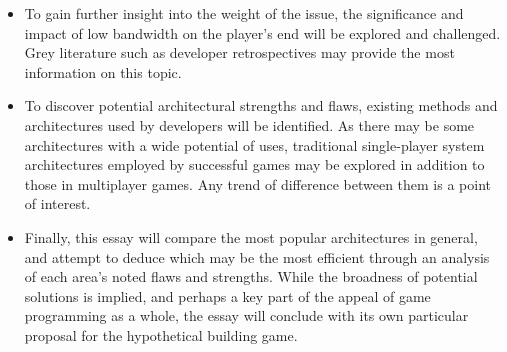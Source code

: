 \documentclass{scrartcl}
\begin{document}
\begin{itemize}
\item To gain further insight into the weight of the issue, the significance and impact of low bandwidth on the player's end will be explored and challenged. Grey literature such as developer retrospectives may provide the most information on this topic.
\item To discover potential architectural strengths and flaws, existing methods and architectures used by developers will be identified. As there may be some architectures with a wide potential of uses, traditional single-player system architectures employed by successful games may be explored in addition to those in multiplayer games. Any trend of difference between them is a point of interest.
\item Finally, this essay will compare the most popular architectures in general, and attempt to deduce which may be the most efficient through an analysis of each area's noted flaws and strengths. While the broadness of potential solutions is implied, and perhaps a key part of the appeal of game programming as a whole, the essay will conclude with its own particular proposal for the hypothetical building game.
\end{itemize}
\nocite{*}
 

\end{document}
